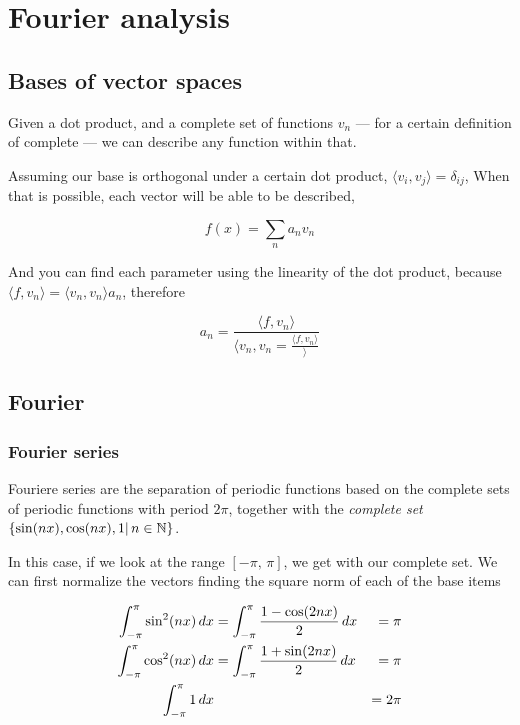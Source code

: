 \documentclass[../main/main.tex]{subfiles}
\begin{document}
\section{Fourier analysis}

\subsection{Bases of vector spaces}

Given a dot product, and a complete set of functions ${v_{n}}$ --- for a certain definition of complete --- we can describe any function within that.

Assuming our base is orthogonal under a certain dot product, $\langle v_{i},v_{j}\!\rangle = \delta_{ij}$, When that is possible, each vector will be able to be described,

\begin{equation}
	f(x) = \sum_{n}a_{n} v_{n}
\end{equation}

And you can find each parameter using the linearity of the dot product,  because $\langle f,\! v_{n}\rangle = \langle v_{n},\! v_{n}\rangle a_{n}$, therefore

\begin{equation}
	a_{n} = \frac{\langle f,\! v_{n}\rangle}{\langle v_{n},\! v_{n} = \frac{\langle f,\! v_{n}\rangle}\rangle}
\end{equation}




\subsection{Fourier}


\subsubsection{Fourier series}

Fouriere series are the separation of periodic functions based on the complete sets  of periodic functions with period $2\pi$, together with the \emph{complete set} $\left\{\sin (nx), \cos(nx), 1 | \,n \in \mathbb{N}\right\}$.

In this case, if we look at the range  $[-\pi,\, \pi]$, we get with our complete set. We can first normalize the vectors finding the square norm of each of the base items

\begin{align}
	\fourierint{\sin^{2}(nx)} & =\fourierint{\frac{1-\cos(2nx)}{2}} & =\pi  \\
	\fourierint{\cos^{2}(nx)} & =\fourierint{\frac{1+\sin(2nx)}{2}} & =\pi  \\
	\fourierint{1}            &                                     & =2\pi
\end{align}
\end{document}
